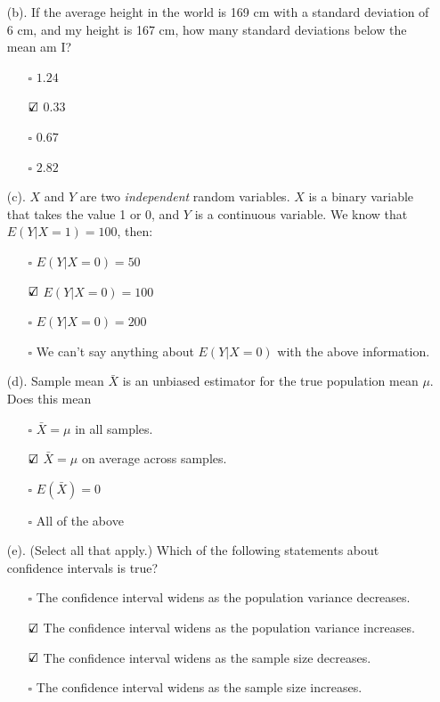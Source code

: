 \documentclass{./../../Latex/tests}
\begin{document}
\begin{enumerate}
\item[(b).] If the average height in the world is 169 cm with a standard deviation of 6 cm, and my height is 167 cm, how many standard deviations below the mean am I?
\begin{enumerate}
\item[$\square$] $1.24$
\item[$\text{\rlap{$\checkmark$}}\square$] $0.33$
\item[$\square$] $0.67$
\item[$\square$] $2.82$ \\
\end{enumerate}
\newpage
\item[(c).] $X$ and $Y$ are two \textit{independent} random variables. $X$ is a binary variable that takes the value 1 or 0, and $Y$ is a continuous variable. We know that $E(Y|X=1) = 100$, then:
\begin{enumerate}
\item[$\square$] $E(Y|X=0) = 50$
\item[$\text{\rlap{$\checkmark$}}\square$] $E(Y|X=0) = 100$
\item[$\square$] $E(Y|X=0) = 200$
\item[$\square$] We can't say anything about $E(Y|X=0)$ with the above information. \\
\end{enumerate}
\item[(d).] Sample mean $\bar{X}$ is an unbiased estimator for the true population mean $\mu$. Does this mean
\begin{enumerate}
	\item[$\square$] $\bar{X}=\mu$ in all samples.
	\item[$\text{\rlap{$\checkmark$}}\square$] $\bar{X}=\mu$ on average across samples.
	\item[$\square$] $E(\bar{X})=0$
	\item[$\square$] All of the above \\
\end{enumerate}
\item[(e).] (Select all that apply.) Which of the following statements about confidence intervals is true?
\begin{enumerate}
	\item[$\square$] The confidence interval widens as the population variance decreases.
	\item[$\text{\rlap{$\checkmark$}}\square$] The confidence interval widens as the population variance increases.
	\item[$\text{\rlap{$\checkmark$}}\square$] The confidence interval widens as the sample size decreases.
	\item[$\square$] The confidence interval widens as the sample size increases. \\
\end{enumerate}
\end{enumerate}
\end{document}
